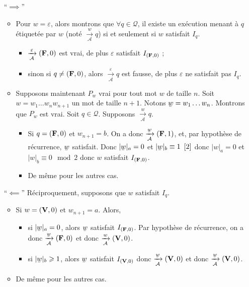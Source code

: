\begin{itemize}
	\item[``$\implies$'']
		\begin{itemize}
			\item Pour $w = \varepsilon$, alors  montrons que $\forall q \in \mathcal{Q}$, il existe un exécution menant à $q$\/ étiquetée par $w$\/ (noté $\xrightarrow[\mathcal{A}]{w}q$) si et seulement si $w$\/ satisfait $I_q$.
				\begin{itemize}
					\item $\xrightarrow[\mathcal{A}]{\varepsilon}({\mathbf{F}}, 0)$\/ est vrai, de plus $\varepsilon$\/ satisfait $I_{({\mathbf{F}}, 0)}$\/ ;
					\item sinon si $q \neq ({\mathbf{F}}, 0)$, alors $\xrightarrow[\mathcal{A}]{\varepsilon}q$\/ est fausse, de plus $\varepsilon$\/ ne satisfait pas $I_q$.
				\end{itemize}
			\item Supposons maintenant $P_w$\/ vrai pour tout mot $w$\/ de taille $n$. Soit $w = w_1\ldots w_nw_{n+1}$\/ un mot de taille $n+1$. Notons $\ubar{w} = w_1\ldots w_n$.
				Montrons que $P_w$\/ est vrai. Soit $q \in \mathcal{Q}$. Supposons $\xrightarrow[\mathcal{A}]{w} q$.
				\begin{itemize}
					\item Si $q = ({\mathbf{F}}, 0)$\/ et $w_{n+1} = b$. On a donc $\xrightarrow[\mathcal{A}]{\ubar{w}}({\bfm F},1)$, et, par hypothèse de récurrence, $\ubar{w}$\/ satisfait. Donc $|\ubar{w}|_a = 0$\/ et $|\ubar{w}|_b \equiv 1 \mod 2$\/ donc $|w|_a = 0$\/ et $|w|_b \equiv 0 \mod 2$\/ donc $w$\/ satisfait $I_{({\mathbf{F}}, 0)}$.
					\item De même pour les autres cas.
				\end{itemize}
		\end{itemize}
	\item[``$\impliedby$''] Réciproquement, supposons que $w$\/ satisfait $I_q$.
		\begin{itemize}
			\item Si $w = ({\mathbf{V}},0)$\/ et $w_{n+1} = a$. Alors,
				\begin{itemize}
					\item si $|\ubar{w}|_a = 0$, alors $\ubar{w} $\/ satisfait $I_{({\mathbf{F}},0)}$. Par hypothèse de récurrence, on a donc $\xrightarrow[\mathcal{A}]{\ubar{w}}({\bfm F},0)$\/ et donc $\xrightarrow[\mathcal{A}]{w}({\mathbf{V}},0)$.
					\item si $|\ubar{w}|_b \ge 1$, alors $\ubar{w}$\/ satisfait $I_{({\mathbf{V}},0)}$\/ donc $\xrightarrow[\mathcal{A}]{\ubar{w}}({\bfm V},0)$\/ et donc $\xrightarrow[\mathcal{A}]{\ubar{w}}({\bfm V},0)$.
				\end{itemize}
			\item De même pour les autres cas.
		\end{itemize}
\end{itemize}
